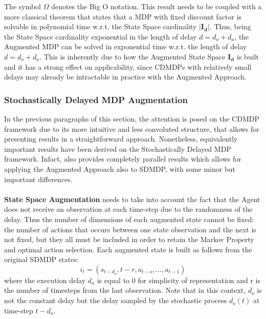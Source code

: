                 The symbol $\Omega$ denotes the Big O notation. This result needs to be coupled with a more classical theorem that states that a MDP with fixed discount factor is solvable in polynomial time w.r.t. the State Space cardinality $| \mathbf{I_d} |$. Thus, being the State Space cardinality exponential in the length of delay $d = d_o + d_a$, the Augmented MDP can be solved in exponential time w.r.t. the length of delay $d = d_o + d_a$. This is inherently due to how the Augmented State Space $\mathbf{I_d}$ is built and it has a strong effect on applicability, since CDMDPs with relatively small delays may already be intractable in practice with the Augmented Approach.
                
            \subsubsection{Stochastically Delayed MDP Augmentation}
                \label{subsubs:sdmdpaug}
                In the previous paragraphs of this section, the attention is posed on the CDMDP framework due to its more intuitive and less convoluted structure, that allows for presenting results in a straightforward approach. Nonetheless, equivalently important results have been derived on the Stochastically Delayed MDP framework. Infact,  also provides completely parallel results which allows for applying the Augmented Approach also to SDMDP, with some minor but important differences.
                \\\\
                \textbf{State Space Augmentation} needs to take into account the fact that the Agent does not receive an observation at each time-step due to the randomness of the delay. Thus the number of dimensions of each augmented state cannot be fixed: the number of actions that occurs between one state observation and the next is not fixed, but they all must be included in order to retain the Markov Property and optimal action selection. Each augmented state is built as follows from the original SDMDP states:
                \[ i_t = \left( s_{t-d_o}, t-r, a_{t-o}, ..., a_{t-1} \right) \]
                where the execution delay $d_a$ is equal to 0 for simplicity of representation and r is the number of timesteps from the last observation. Note that in this context, $d_o$ is not the constant delay but the delay sampled by the stochastic process $d_o(t)$ at time-step $t-d_o$. 
                \\\\
